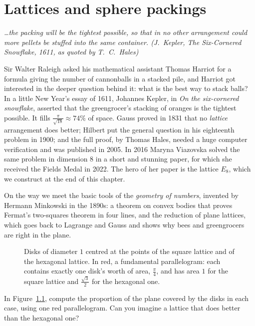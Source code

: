 \chapter{Lattices and sphere packings}\label{ch:lattices}

\begin{center}\itshape
\dots the packing will be the tightest possible, so that in no other arrangement could more pellets be stuffed into the same container.
\upshape(J.~Kepler, \emph{The Six-Cornered Snowflake}, 1611, as quoted by T.~C.~Hales)
\end{center}

Sir Walter Raleigh asked his mathematical assistant Thomas Harriot for a formula giving the number of cannonballs in a stacked pile, and
Harriot got interested in the deeper question behind it: what is the best way to stack balls? In a little New Year's essay of 1611, Johannes Kepler, in \emph{On the six-cornered snowflake}, asserted that the greengrocer's stacking of oranges is the tightest possible.
It fills $\frac\pi{\sqrt{18}}\approx74\%$ of space. Gauss proved in 1831 that no \emph{lattice} arrangement does better; Hilbert put the general question
in his eighteenth problem in 1900; and the full proof, by Thomas Hales, needed a huge computer verification and was published in 2005. In 2016 Maryna
Viazovska solved the same problem in dimension $8$ in a short and stunning paper, for which she received the Fields Medal in 2022. The hero of her paper
is the lattice $E_8$, which we construct at the end of this chapter.

On the way we meet the basic tools of the \emph{geometry of numbers}, invented by Hermann Minkowski in the 1890s: a theorem on convex bodies that proves
Fermat's two-squares theorem in four lines, and the reduction of plane lattices, which goes back to Lagrange and Gauss and shows why bees and
greengrocers are right in the plane.

\begin{figure}[ht]
\centering
{}
\caption{Disks of diameter $1$ centred at the points of the square lattice and of the hexagonal lattice. In red, a fundamental parallelogram: each
contains exactly one disk's worth of area, $\frac\pi4$, and has area $1$ for the square lattice and $\frac{\sqrt3}2$ for the hexagonal one.}
\label{fig:packings}
\end{figure}

\begin{think}
In Figure~\ref{fig:packings}, compute the proportion of the plane covered by the disks in each case, using one red parallelogram. Can you imagine a lattice
that does better than the hexagonal one?
\end{think}


